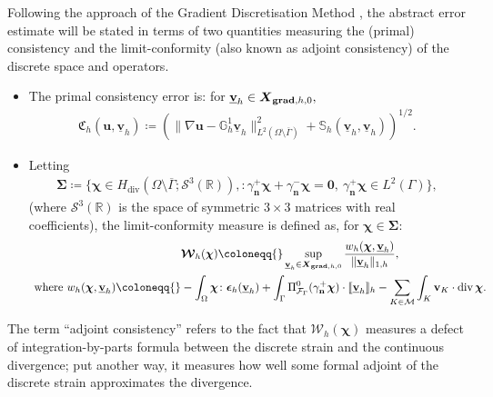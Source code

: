 \documentclass[a4paper,11pt]{article}
\theoremstyle{definition}
\theoremstyle{remark}
\newcommand{\uvec}[1]{\underline{\mathbf{#1}}}
\newcommand{\bo}[1]{\mathbf{#1}}
\newcommand{\bos}[1]{\boldsymbol{#1}}
\newcommand{\dgr}[1]{\mathbb G^1_{#1}}
\def\be{\boldsymbol{\epsilon}}
\def\cF{\mathcal{F}}
\def\cM{\mathcal{M}}
\def\cW{\mathcal{W}}
\def\fC{\mathfrak{C}}
\def\ddgs{\boldsymbol{X}_{{\bf grad},h,0}}
\def\sjump#1{[\hskip -1.5pt[#1]\hskip -1.5pt]}
\def\O{\Omega}
\newcommand{\DIV}{\operatorname{\mathrm{div}}}
\begin{document}
Following the approach of the Gradient Discretisation Method \cite{gdm}, the abstract error estimate will be stated in terms of two quantities measuring the (primal) consistency and the limit-conformity (also known as adjoint consistency) of the discrete space and operators.
\begin{itemize}
\item The primal consistency error is: for $\uvec{v}_h\in\ddgs,$
\begin{align}\label{eq:primal.consist}
\bos{\fC}_h(\bo{u},\uvec{v}_h)\coloneqq \left(\lVert \nabla \bo{u}-\dgr{h}\uvec{v}_h\rVert_{L^2(\O\setminus\overline{\Gamma})}^2+\mathbb S_h(\uvec{v}_h,\uvec{v}_h)\right)^{1/2}.
\end{align}
\item Letting
\begin{align*}
\bo{\Sigma}\coloneqq\{\bos{\chi}\in H_{\DIV}(\O\setminus\overline{\Gamma};\mathcal{S}^3(\mathbb R)),\colon \gamma^+_{\bo{n}}\bos{\chi}+\gamma^-_{\bo{n}}\bos{\chi}=\bo{0},~\gamma^+_{\bo{n}}\bos{\chi}\in L^2(\Gamma)\},
\end{align*}
(where $\mathcal S^3(\mathbb R)$ is the space of symmetric $3\times 3$ matrices with real coefficients), the limit-conformity measure is defined as, for $\bos{\chi}\in\bo{\Sigma}:$
\begin{equation}\label{eq:adjoint.consist}
  \begin{aligned}
&  \bos{\cW}_h(\bos{\chi})\coloneqq{} \sup\limits_{\uvec{v}_h\in\ddgs}\frac{w_h(\bos{\chi},\uvec{v}_h)}{\lVert\uvec{v}_h\rVert_{1,h}}, \\
\text{ where }  w_h(\bos{\chi},\uvec{v}_h)\coloneqq{}& -\int_\O \bos{\chi}\colon \be_h(\uvec{v}_h)+\int_\Gamma \Pi^0_{\cF_\Gamma}(\gamma^+_{\bo{n}}\bos{\chi})\cdot\sjump{\uvec{v}_h}_h-\sum_{K\in\cM}\int_{K}\bo{v}_K\cdot\DIV\bos{\chi}.
  \end{aligned}
\end{equation}
\end{itemize}
The term ``adjoint consistency'' refers to the fact that $\bos{\cW}_h(\bos{\chi})$ measures a defect of integration-by-parts formula between the  discrete strain and the continuous divergence; put another way, it measures how well some formal adjoint of the discrete strain approximates the divergence.
\end{document}
